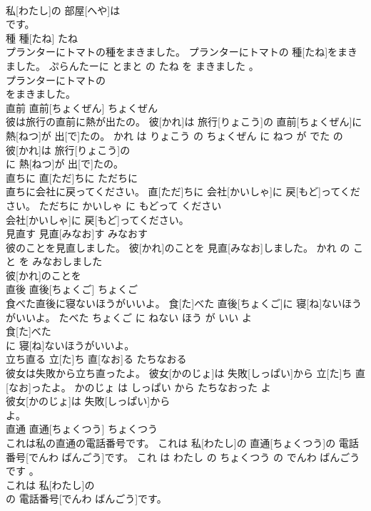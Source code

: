\documentclass[8pt]{extreport}
\begin{document}
\begin{CJK}{UTF8}{min}
\\	私[わたし]の 部屋[へや]は
\\	です。			
\\	種	種[たね]	たね	
\\	プランターにトマトの種をまきました。	プランターにトマトの 種[たね]をまきました。	ぷらんたーに とまと の たね を まきました 。	
\\	プランターにトマトの
\\	をまきました。			
\\	直前	直前[ちょくぜん]	ちょくぜん	
\\	彼は旅行の直前に熱が出たの。	彼[かれ]は 旅行[りょこう]の 直前[ちょくぜん]に 熱[ねつ]が 出[で]たの。	かれ は りょこう の ちょくぜん に ねつ が でた の	
\\	彼[かれ]は 旅行[りょこう]の
\\	に 熱[ねつ]が 出[で]たの。			
\\	直ちに	直[ただ]ちに	ただちに	
\\	直ちに会社に戻ってください。	直[ただ]ちに 会社[かいしゃ]に 戻[もど]ってください。	ただちに かいしゃ に もどって ください	
\\	会社[かいしゃ]に 戻[もど]ってください。			
\\	見直す	見直[みなお]す	みなおす	
\\	彼のことを見直しました。	彼[かれ]のことを 見直[みなお]しました。	かれ の こと を みなおしました	
\\	彼[かれ]のことを
\\	直後	直後[ちょくご]	ちょくご	
\\	食べた直後に寝ないほうがいいよ。	食[た]べた 直後[ちょくご]に 寝[ね]ないほうがいいよ。	たべた ちょくご に ねない ほう が いい よ	
\\	食[た]べた
\\	に 寝[ね]ないほうがいいよ。			
\\	立ち直る	立[た]ち 直[なお]る	たちなおる	
\\	彼女は失敗から立ち直ったよ。	彼女[かのじょ]は 失敗[しっぱい]から 立[た]ち 直[なお]ったよ。	かのじょ は しっぱい から たちなおった よ	
\\	彼女[かのじょ]は 失敗[しっぱい]から
\\	よ。			
\\	直通	直通[ちょくつう]	ちょくつう	
\\	これは私の直通の電話番号です。	これは 私[わたし]の 直通[ちょくつう]の 電話番号[でんわ ばんごう]です。	これ は わたし の ちょくつう の でんわ ばんごう です 。	
\\	これは 私[わたし]の
\\	の 電話番号[でんわ ばんごう]です。			

\end{CJK}
\end{document}

